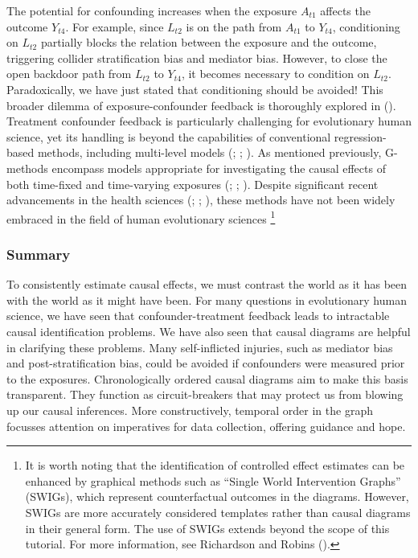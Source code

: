 \documentclass[
  singlecolumn,
  9pt]{article}
\begin{document}
The potential for confounding increases when the exposure \(A_{t1}\)
affects the outcome \(Y_{t4}\). For example, since \(L_{t2}\) is on the
path from \(A_{t1}\) to \(Y_{t4}\), conditioning on \(L_{t2}\) partially
blocks the relation between the exposure and the outcome, triggering
collider stratification bias and mediator bias. However, to close the
open backdoor path from \(L_{t2}\) to \(Y_{t4}\), it becomes necessary
to condition on \(L_{t2}\). Paradoxically, we have just stated that
conditioning should be avoided! This broader dilemma of
exposure-confounder feedback is thoroughly explored in
(). Treatment
confounder feedback is particularly challenging for evolutionary human
science, yet its handling is beyond the capabilities of conventional
regression-based methods, including multi-level models
(;
; ). As mentioned previously, G-methods encompass
models appropriate for investigating the causal effects of both
time-fixed and time-varying exposures
(;
;
). Despite significant
recent advancements in the health sciences
(;
;
), these methods have
not been widely embraced in the field of human evolutionary sciences
\footnote{It is worth noting that the identification of controlled
  effect estimates can be enhanced by graphical methods such as ``Single
  World Intervention Graphs'' (SWIGs), which represent counterfactual
  outcomes in the diagrams. However, SWIGs are more accurately
  considered templates rather than causal diagrams in their general
  form. The use of SWIGs extends beyond the scope of this tutorial. For
  more information, see Richardson and Robins
  ().}

\subsubsection{Summary}\label{summary}

To consistently estimate causal effects, we must contrast the world as
it has been with the world as it might have been. For many questions in
evolutionary human science, we have seen that confounder-treatment
feedback leads to intractable causal identification problems. We have
also seen that causal diagrams are helpful in clarifying these problems.
Many self-inflicted injuries, such as mediator bias and
post-stratification bias, could be avoided if confounders were measured
prior to the exposures. Chronologically ordered causal diagrams aim to
make this basis transparent. They function as circuit-breakers that may
protect us from blowing up our causal inferences. More constructively,
temporal order in the graph focusses attention on imperatives for data
collection, offering guidance and hope.
\end{document}
